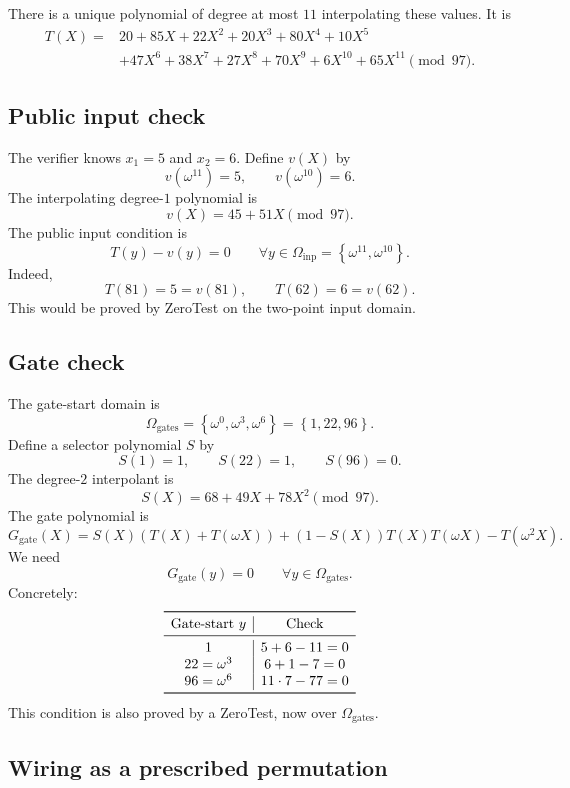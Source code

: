 \documentclass[11pt]{article}
\newcommand{\set}[1]{\left\{#1\right\}}
\begin{document}
There is a unique polynomial of degree at most $11$ interpolating these values. It is
\[
\begin{aligned}
T(X)={}&20+85X+22X^2+20X^3+80X^4+10X^5\\
&+47X^6+38X^7+27X^8+70X^9+6X^{10}+65X^{11}
\pmod{97}.
\end{aligned}
\]

\subsection{Public input check}

The verifier knows $x_1=5$ and $x_2=6$. Define $v(X)$ by
\[
    v(\omega^{11})=5,
    \qquad
    v(\omega^{10})=6.
\]
The interpolating degree-$1$ polynomial is
\[
    v(X)=45+51X\pmod{97}.
\]
The public input condition is
\[
    T(y)-v(y)=0
    \qquad
    \forall y\in\Omega_{\mathrm{inp}}=\set{\omega^{11},\omega^{10}}.
\]
Indeed,
\[
    T(81)=5=v(81),
    \qquad
    T(62)=6=v(62).
\]
This would be proved by ZeroTest on the two-point input domain.

\subsection{Gate check}

The gate-start domain is
\[
    \Omega_{\mathrm{gates}}=\set{\omega^0,\omega^3,\omega^6}=\set{1,22,96}.
\]
Define a selector polynomial $S$ by
\[
    S(1)=1,
    \qquad
    S(22)=1,
    \qquad
    S(96)=0.
\]
The degree-$2$ interpolant is
\[
    S(X)=68+49X+78X^2\pmod{97}.
\]
The gate polynomial is
\[
    G_{\mathrm{gate}}(X)
    =S(X)(T(X)+T(\omega X))+(1-S(X))T(X)T(\omega X)-T(\omega^2X).
\]
We need
\[
    G_{\mathrm{gate}}(y)=0
    \qquad\forall y\in\Omega_{\mathrm{gates}}.
\]
Concretely:
\[
\begin{array}{c|c}
\toprule
\text{Gate-start }y & \text{Check}\\
\midrule
1 & 5+6-11=0\\
22=\omega^3 & 6+1-7=0\\
96=\omega^6 & 11\cdot7-77=0\\
\bottomrule
\end{array}
\]
This condition is also proved by a ZeroTest, now over $\Omega_{\mathrm{gates}}$.

\subsection{Wiring as a prescribed permutation}
\end{document}
